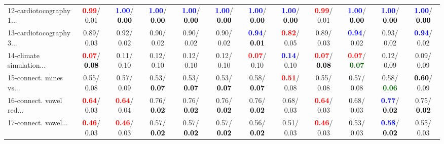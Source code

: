 \begin{table}[h]
\begin{center}
{\begin{tabular}{lc|c|c|c|c|c|c|c|c|c|c}
12-cardiotocography 1... & \textcolor{red}{\textbf{  0.99}}/  0.01 & \textcolor{blue}{\textbf{  1.00}}/\textcolor{black}{\textbf{  0.00}} & \textcolor{blue}{\textbf{  1.00}}/\textcolor{black}{\textbf{  0.00}} & \textcolor{blue}{\textbf{  1.00}}/\textcolor{black}{\textbf{  0.00}} & \textcolor{blue}{\textbf{  1.00}}/\textcolor{black}{\textbf{  0.00}} & \textcolor{blue}{\textbf{  1.00}}/\textcolor{black}{\textbf{  0.00}} & \textcolor{blue}{\textbf{  1.00}}/\textcolor{black}{\textbf{  0.00}} & \textcolor{red}{\textbf{  0.99}}/  0.01 & \textcolor{blue}{\textbf{  1.00}}/\textcolor{black}{\textbf{  0.00}} & \textcolor{blue}{\textbf{  1.00}}/\textcolor{black}{\textbf{  0.00}} & \textcolor{blue}{\textbf{  1.00}}/\textcolor{black}{\textbf{  0.00}} \\
13-cardiotocography 3... &   0.89/  0.03 &   0.92/  0.02 &   0.90/  0.02 &   0.90/  0.02 &   0.90/  0.02 & \textcolor{blue}{\textbf{  0.94}}/\textcolor{black}{\textbf{  0.01}} & \textcolor{red}{\textbf{  0.82}}/  0.05 &   0.89/  0.03 & \textcolor{blue}{\textbf{  0.94}}/  0.02 &   0.93/  0.02 & \textcolor{blue}{\textbf{  0.94}}/  0.02 \\
14-climate simulation... & \textcolor{red}{\textbf{  0.07}}/\textcolor{black}{\textbf{  0.08}} &   0.11/  0.10 &   0.12/  0.10 &   0.12/  0.10 &   0.12/  0.10 & \textcolor{red}{\textbf{  0.07}}/  0.10 & \textcolor{blue}{\textbf{  0.14}}/  0.10 & \textcolor{red}{\textbf{  0.07}}/\textcolor{black}{\textbf{  0.08}} & \textcolor{red}{\textbf{  0.07}}/\textcolor{darkgreen}{\textbf{  0.07}} &   0.12/  0.09 &   0.09/  0.09 \\ \hline
15-connect. mines vs... &   0.55/  0.08 &   0.57/  0.09 &   0.53/\textcolor{black}{\textbf{  0.07}} &   0.53/\textcolor{black}{\textbf{  0.07}} &   0.53/\textcolor{black}{\textbf{  0.07}} &   0.58/\textcolor{black}{\textbf{  0.07}} & \textcolor{red}{\textbf{  0.51}}/  0.08 &   0.55/  0.08 &   0.57/  0.08 &   0.58/\textcolor{darkgreen}{\textbf{  0.06}} & \textcolor{black}{\textbf{  0.60}}/  0.09 \\
16-connect. vowel red... & \textcolor{red}{\textbf{  0.64}}/  0.03 & \textcolor{red}{\textbf{  0.64}}/  0.04 &   0.76/\textcolor{black}{\textbf{  0.02}} &   0.76/\textcolor{black}{\textbf{  0.02}} &   0.76/\textcolor{black}{\textbf{  0.02}} &   0.76/\textcolor{black}{\textbf{  0.02}} &   0.68/  0.03 & \textcolor{red}{\textbf{  0.64}}/  0.03 &   0.68/  0.03 & \textcolor{blue}{\textbf{  0.77}}/\textcolor{black}{\textbf{  0.02}} &   0.75/\textcolor{black}{\textbf{  0.02}} \\
17-connect. vowel... & \textcolor{red}{\textbf{  0.46}}/  0.03 & \textcolor{red}{\textbf{  0.46}}/  0.03 &   0.57/\textcolor{black}{\textbf{  0.02}} &   0.57/\textcolor{black}{\textbf{  0.02}} &   0.57/\textcolor{black}{\textbf{  0.02}} &   0.56/\textcolor{black}{\textbf{  0.02}} &   0.51/  0.03 & \textcolor{red}{\textbf{  0.46}}/  0.03 &   0.53/  0.03 & \textcolor{blue}{\textbf{  0.58}}/\textcolor{black}{\textbf{  0.02}} &   0.55/  0.03 \\

\end{tabular}}
\end{center}
\end{table}
